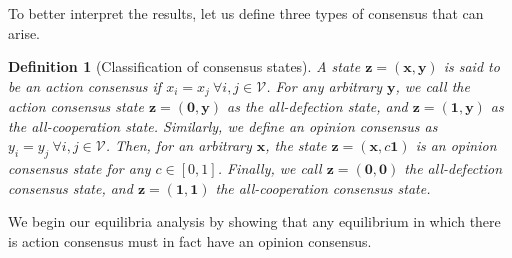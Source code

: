 \documentclass[letterpaper, 10 pt, conference]{ieeeconf}  %
\newcommand{\vect}[1]{\boldsymbol{#1}}
\newtheorem{definition}{Definition}
\renewcommand{\eqref}[1]{Eq.~(\ref{#1})}  %
\begin{document}

To better interpret the results, let us define three types of consensus that can arise. 

\begin{definition}[Classification of consensus states]
    A state $\vect z = (\vect x, \vect y)$ is said to be an {action consensus} if $x_i=x_j \ \forall i,j \in \mathcal{V}$. For any arbitrary $\vect y$, we call the action consensus state $\vect z = (\vect 0, \vect y)$ as the all-defection state, and $\vect z = (\vect 1, \vect y)$ as the all-cooperation state. Similarly, we define an {opinion consensus} as $y_i=y_j \ \forall i,j \in \mathcal{V}$. Then, for an arbitrary $\vect x$, the state $\vect z = (\vect x, c\vect 1)$ is an opinion consensus state for any $c\in [0,1]$. Finally, we call $\vect z = (\vect 0, \vect 0)$ the {all-defection consensus} state, and $\vect z = (\vect 1, \vect 1)$ the {all-cooperation consensus} state.
\end{definition}

We begin our equilibria analysis by showing that any equilibrium in which there is action consensus must in fact have an opinion consensus.
\end{document}
